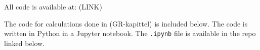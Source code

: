 All code is available at: (LINK) 

The code for calculations done in (GR-kapittel) is included below. 
The code is written in Python in a Jupyter notebook.
The \texttt{.ipynb} file is available in the repo linked below. 


